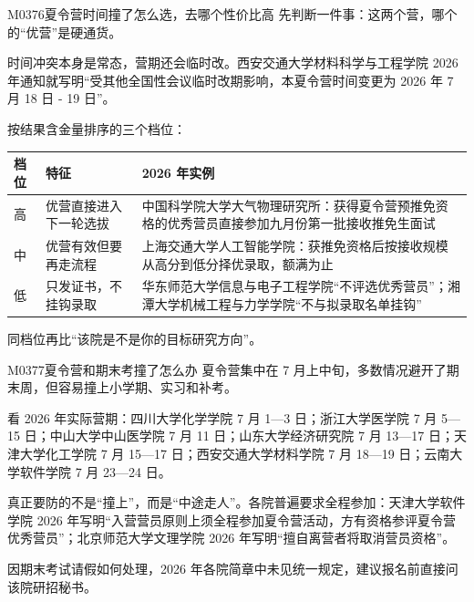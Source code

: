 \begin{qa}{M0376}{夏令营时间撞了怎么选，去哪个性价比高}
先判断一件事：这两个营，哪个的“优营”是硬通货。

时间冲突本身是常态，营期还会临时改。西安交通大学材料科学与工程学院 2026 年通知就写明“受其他全国性会议临时改期影响，本夏令营时间变更为 2026 年 7 月 18 日 - 19 日”。

按结果含金量排序的三个档位：
\par\vspace{2pt}\nobreak\begin{center}\footnotesize
\begin{tabularx}{\textwidth}{>{\raggedright\arraybackslash}X>{\raggedright\arraybackslash}X>{\raggedright\arraybackslash}X}
\toprule
\textbf{档位} & \textbf{特征} & \textbf{2026 年实例} \\ \midrule
高 & 优营直接进入下一轮选拔 & 中国科学院大学大气物理研究所：获得夏令营预推免资格的优秀营员直接参加九月份第一批接收推免生面试 \\
中 & 优营有效但要再走流程 & 上海交通大学人工智能学院：获推免资格后按接收规模从高分到低分择优录取，额满为止 \\
低 & 只发证书，不挂钩录取 & 华东师范大学信息与电子工程学院“不评选优秀营员”；湘潭大学机械工程与力学学院“不与拟录取名单挂钩” \\
\bottomrule
\end{tabularx}
\end{center}\vspace{2pt}\par

同档位再比“该院是不是你的目标研究方向”。
\end{qa}

\begin{qa}{M0377}{夏令营和期末考撞了怎么办}
夏令营集中在 7 月上中旬，多数情况避开了期末周，但容易撞上小学期、实习和补考。

看 2026 年实际营期：四川大学化学学院 7 月 1—3 日；浙江大学医学院 7 月 5—15 日；中山大学中山医学院 7 月 11 日；山东大学经济研究院 7 月 13—17 日；天津大学化工学院 7 月 15—17 日；西安交通大学材料学院 7 月 18—19 日；云南大学软件学院 7 月 23—24 日。

真正要防的不是“撞上”，而是“中途走人”。各院普遍要求全程参加：天津大学软件学院 2026 年写明“入营营员原则上须全程参加夏令营活动，方有资格参评夏令营优秀营员”；北京师范大学文理学院 2026 年写明“擅自离营者将取消营员资格”。

因期末考试请假如何处理，2026 年各院简章中未见统一规定，建议报名前直接问该院研招秘书。
\end{qa}

